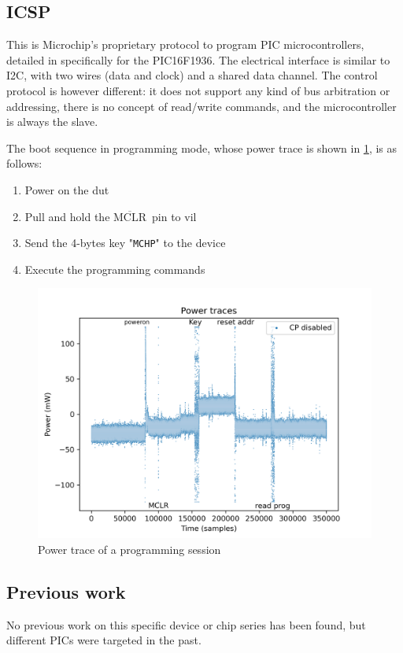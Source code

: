 \documentclass[a4paper,english,twoside,10pt]{article}
\newcommand{\mclr}{\(\overline{\mbox{MCLR}}\)\ }
\begin{document}
\subsection{ICSP}
This is Microchip's proprietary protocol to program PIC microcontrollers, detailed in \cite{microchip:DS41397B} specifically for the PIC16F1936. The electrical interface is similar to I2C, with two wires (data and clock) and a shared data channel. The control protocol is however different: it does not support any kind of bus arbitration or addressing, there is no concept of read/write commands, and the microcontroller is always the slave.

The boot sequence in programming mode, whose power trace is shown in \cref{fig:powertrace}, is as follows:
\begin{enumerate}
	\item Power on the \gls{dut}
	\item Pull and hold the \mclr pin to \gls{vil}
	\item Send the 4-bytes key "\texttt{MCHP}" to the device
	\item Execute the programming commands
\end{enumerate}

\begin{figure}[htbp]
	\centering%
	\includegraphics[width=.75\textwidth]{seaborn_power_trace.png}
	\caption{Power trace of a programming session}
	\label{fig:powertrace}
\end{figure}

\subsection{Previous work}
No previous work on this specific device or chip series has been found, but different PICs were targeted in the past.
\end{document}
